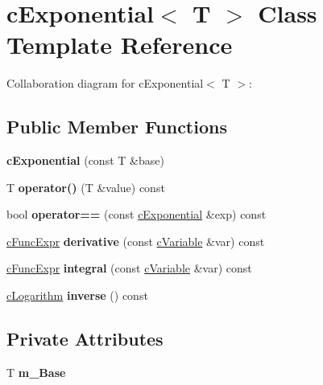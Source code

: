 \hypertarget{classcExponential}{\section{c\-Exponential$<$ T $>$ Class Template Reference}
\label{classcExponential}
}


Collaboration diagram for c\-Exponential$<$ T $>$\-:
\subsection*{Public Member Functions}
\begin{DoxyCompactItemize}
\item 
\hypertarget{classcExponential_ac268a87ae37b6e931a38ff7f1ae8c192}{{\bfseries c\-Exponential} (const T \&base)}\label{classcExponential_ac268a87ae37b6e931a38ff7f1ae8c192}

\item 
\hypertarget{classcExponential_acd7514a9fcee11ac8e8b43165a83f0da}{T {\bfseries operator()} (T \&value) const }\label{classcExponential_acd7514a9fcee11ac8e8b43165a83f0da}

\item 
\hypertarget{classcExponential_a954417fe5ea791fa1477d64faf693309}{bool {\bfseries operator==} (const \hyperlink{classcExponential}{c\-Exponential} \&exp) const }\label{classcExponential_a954417fe5ea791fa1477d64faf693309}

\item 
\hypertarget{classcExponential_ab27ab67e067f54f5ee42e816897e4092}{\hyperlink{classcFuncExpr}{c\-Func\-Expr} {\bfseries derivative} (const \hyperlink{classcVariable}{c\-Variable} \&var) const }\label{classcExponential_ab27ab67e067f54f5ee42e816897e4092}

\item 
\hypertarget{classcExponential_a90de4ee5831c92d5e32f1f1f121fd9fd}{\hyperlink{classcFuncExpr}{c\-Func\-Expr} {\bfseries integral} (const \hyperlink{classcVariable}{c\-Variable} \&var) const }\label{classcExponential_a90de4ee5831c92d5e32f1f1f121fd9fd}

\item 
\hypertarget{classcExponential_af9927695441247c37d54968ddbfc3e28}{\hyperlink{classcLogarithm}{c\-Logarithm} {\bfseries inverse} () const }\label{classcExponential_af9927695441247c37d54968ddbfc3e28}

\end{DoxyCompactItemize}
\subsection*{Private Attributes}
\begin{DoxyCompactItemize}
\item 
\hypertarget{classcExponential_a6cd5555c6e9c51d6cc4dd17cbec576c9}{T {\bfseries m\-\_\-\-Base}}\label{classcExponential_a6cd5555c6e9c51d6cc4dd17cbec576c9}

\end{DoxyCompactItemize}
